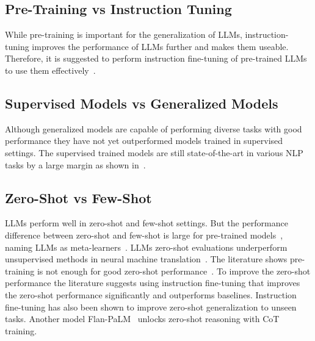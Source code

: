 \subsection{Pre-Training vs 
Instruction Tuning}
While pre-training is important for the generalization of LLMs, instruction-tuning improves the performance of LLMs further and makes them useable. Therefore, it is suggested to perform instruction fine-tuning of pre-trained LLMs to use them effectively~\cite{Flan, Tk-INSTRUCT, instructgpt, OPT_IML, nakano2021webgpt}. 
\subsection{Supervised Models vs Generalized Models}
Although generalized models are capable of performing diverse tasks with good performance they have not yet outperformed models trained in supervised settings. The supervised trained models are still state-of-the-art in various NLP tasks by a large margin as shown in~\cite{GPT-3, PaLM, Tk-INSTRUCT}.   
\subsection{Zero-Shot vs Few-Shot}
LLMs perform well in zero-shot and few-shot settings. But the performance difference between zero-shot and few-shot is large for pre-trained models~\cite{GPT-3, PaLM}, naming LLMs as meta-learners~\cite{GPT-3}. LLMs zero-shot evaluations underperform unsupervised methods in neural machine translation~\cite{GPT-3}. The literature shows pre-training is not enough for good zero-shot performance~\cite{PaLM, Flan}. To improve the zero-shot performance the literature suggests using instruction fine-tuning that improves the zero-shot performance significantly and outperforms baselines. Instruction fine-tuning has also been shown to improve zero-shot generalization to unseen tasks. Another model Flan-PaLM~\cite{Flan} unlocks zero-shot reasoning with CoT training. 

